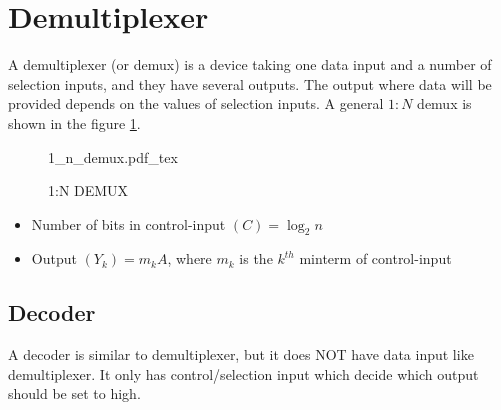 \documentclass[oneside]{book}
\newcommand{\incfig}[1]{%
    {#1.pdf_tex}
}
\begin{document}
\section{Demultiplexer}
A demultiplexer (or demux) is a device taking one data input and a number of selection inputs, and they have several outputs. The output where data will be provided depends on the values of selection inputs. \cite{multiplexer_wiki}
A general \(1:N\) demux is shown in the figure \cref{1_n_demux}.
\begin{figure}[H]
	\centering
	\incfig{1_n_demux}
	\caption{1:N DEMUX}
	\label{1_n_demux}
\end{figure}
\begin{itemize}
	\item Number of bits in control-input \((C) = \log_2{n}\)
	\item Output \((Y_k) = m_kA\), where \(m_k\) is the \(k^{th}\) minterm of control-input
\end{itemize}

\subsection{Decoder}
A decoder is similar to demultiplexer, but it does NOT have data input like demultiplexer. It only has control/selection input which decide which output should be set to high.



\end{document}
